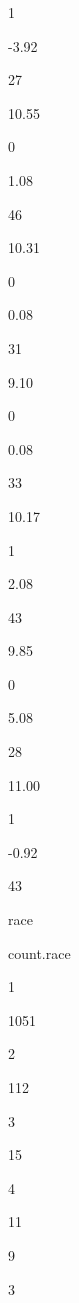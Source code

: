 \documentclass[]{article}
\newenvironment{Shaded}{\begin{snugshade}}{\end{snugshade}}
\newcommand{\CommentTok}[1]{\textcolor[rgb]{0.56,0.35,0.01}{\textit{#1}}}
\newcommand{\DataTypeTok}[1]{\textcolor[rgb]{0.13,0.29,0.53}{#1}}
\newcommand{\KeywordTok}[1]{\textcolor[rgb]{0.13,0.29,0.53}{\textbf{#1}}}
\newcommand{\NormalTok}[1]{#1}
\newcommand{\OperatorTok}[1]{\textcolor[rgb]{0.81,0.36,0.00}{\textbf{#1}}}
\newcommand{\StringTok}[1]{\textcolor[rgb]{0.31,0.60,0.02}{#1}}
\begin{document}
1

-3.92

27

10.55

0

1.08

46

10.31

0

0.08

31

9.10

0

0.08

33

10.17

1

2.08

43

9.85

0

5.08

28

11.00

1

-0.92

43

\begin{Shaded}
\end{Shaded}

race

count.race

1

1051

2

112

3

15

4

11

9

3
\end{document}
